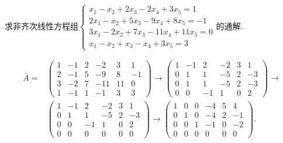 \begin{exercise}
\begin{exgroup}
        \item 求非齐次线性方程组$\begin{cases}
                x_1-x_2+2x_3-2x_4+3x_5=1     \\
                2x_1-x_2+5x_3-9x_4+8x_5=-1   \\
                3x_1-2x_2+7x_3-11x_4+11x_5=0 \\
                x_1-x_2+x_3-x_4+3x_5=3
            \end{cases}$的通解.

        \begin{answer}
            \begin{align*}
                \bar{A} ={} &
                \begin{pmatrix}
                    1 & -1 & 2 & -2  & 3  & 1  \\
                    2 & -1 & 5 & -9  & 8  & -1 \\
                    3 & -2 & 7 & -11 & 11 & 0  \\
                    1 & -1 & 1 & -1  & 3  & 3
                \end{pmatrix}
                \rightarrow
                \begin{pmatrix}
                    1 & -1 & 2  & -2 & 3 & 1  \\
                    0 & 1  & 1  & -5 & 2 & -3 \\
                    0 & 1  & 1  & -5 & 2 & -3 \\
                    0 & 0  & -1 & 1  & 0 & 2
                \end{pmatrix} \rightarrow \\
                            &
                \begin{pmatrix}
                    1 & -1 & 2  & -2 & 3 & 1  \\
                    0 & 1  & 1  & -5 & 2 & -3 \\
                    0 & 0  & -1 & 1  & 0 & 2  \\
                    0 & 0  & 0  & 0  & 0 & 0
                \end{pmatrix}
                \rightarrow
                \begin{pmatrix}
                    1 & 0 & 0 & -4 & 5 & 4  \\
                    0 & 1 & 0 & -4 & 2 & -1 \\
                    0 & 0 & 1 & -1 & 0 & -2 \\
                    0 & 0 & 0 & 0  & 0 & 0
                \end{pmatrix}.

\end{align*}
\end{answer}
\end{exgroup}
\end{exercise}
